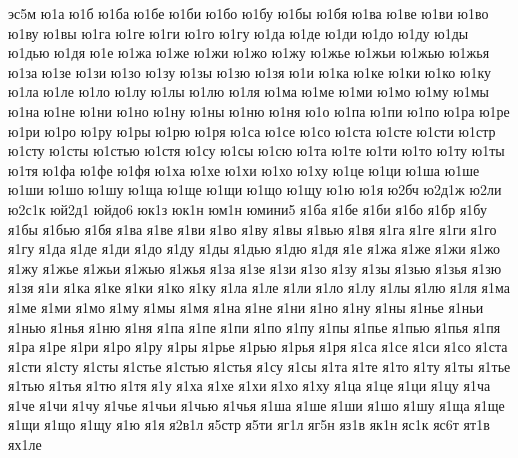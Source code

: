 {эс5м
ю1а
ю1б
ю1ба
ю1бе
ю1би
ю1бо
ю1бу
ю1бы
ю1бя
ю1ва
ю1ве
ю1ви
ю1во
ю1ву
ю1вы
ю1га
ю1ге
ю1ги
ю1го
ю1гу
ю1да
ю1де
ю1ди
ю1до
ю1ду
ю1ды
ю1дью
ю1дя
ю1е
ю1жа
ю1же
ю1жи
ю1жо
ю1жу
ю1жье
ю1жьи
ю1жью
ю1жья
ю1за
ю1зе
ю1зи
ю1зо
ю1зу
ю1зы
ю1зю
ю1зя
ю1и
ю1ка
ю1ке
ю1ки
ю1ко
ю1ку
ю1ла
ю1ле
ю1ло
ю1лу
ю1лы
ю1лю
ю1ля
ю1ма
ю1ме
ю1ми
ю1мо
ю1му
ю1мы
ю1на
ю1не
ю1ни
ю1но
ю1ну
ю1ны
ю1ню
ю1ня
ю1о
ю1па
ю1пи
ю1по
ю1ра
ю1ре
ю1ри
ю1ро
ю1ру
ю1ры
ю1рю
ю1ря
ю1са
ю1се
ю1со
ю1ста
ю1сте
ю1сти
ю1стр
ю1сту
ю1сты
ю1стью
ю1стя
ю1су
ю1сы
ю1сю
ю1та
ю1те
ю1ти
ю1то
ю1ту
ю1ты
ю1тя
ю1фа
ю1фе
ю1фя
ю1ха
ю1хе
ю1хи
ю1хо
ю1ху
ю1це
ю1ци
ю1ша
ю1ше
ю1ши
ю1шо
ю1шу
ю1ща
ю1ще
ю1щи
ю1що
ю1щу
ю1ю
ю1я
ю2бч
ю2д1ж
ю2ли
ю2с1к
юй2д1
юйдо6
юк1з
юк1н
юм1н
юмини5
я1ба
я1бе
я1би
я1бо
я1бр
я1бу
я1бы
я1бью
я1бя
я1ва
я1ве
я1ви
я1во
я1ву
я1вы
я1вью
я1вя
я1га
я1ге
я1ги
я1го
я1гу
я1да
я1де
я1ди
я1до
я1ду
я1ды
я1дью
я1дю
я1дя
я1е
я1жа
я1же
я1жи
я1жо
я1жу
я1жье
я1жьи
я1жью
я1жья
я1за
я1зе
я1зи
я1зо
я1зу
я1зы
я1зью
я1зья
я1зю
я1зя
я1и
я1ка
я1ке
я1ки
я1ко
я1ку
я1ла
я1ле
я1ли
я1ло
я1лу
я1лы
я1лю
я1ля
я1ма
я1ме
я1ми
я1мо
я1му
я1мы
я1мя
я1на
я1не
я1ни
я1но
я1ну
я1ны
я1нье
я1ньи
я1нью
я1нья
я1ню
я1ня
я1па
я1пе
я1пи
я1по
я1пу
я1пы
я1пье
я1пью
я1пья
я1пя
я1ра
я1ре
я1ри
я1ро
я1ру
я1ры
я1рье
я1рью
я1рья
я1ря
я1са
я1се
я1си
я1со
я1ста
я1сти
я1сту
я1сты
я1стье
я1стью
я1стья
я1су
я1сы
я1та
я1те
я1то
я1ту
я1ты
я1тье
я1тью
я1тья
я1тю
я1тя
я1у
я1ха
я1хе
я1хи
я1хо
я1ху
я1ца
я1це
я1ци
я1цу
я1ча
я1че
я1чи
я1чу
я1чье
я1чьи
я1чью
я1чья
я1ша
я1ше
я1ши
я1шо
я1шу
я1ща
я1ще
я1щи
я1що
я1щу
я1ю
я1я
я2в1л
я5стр
я5ти
яг1л
яг5н
яз1в
як1н
яс1к
яс6т
ят1в
ях1ле
}
